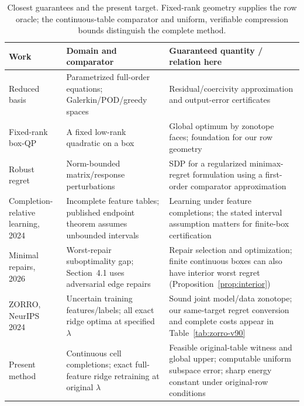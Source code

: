 \begin{table}[t]\centering\small\setlength{\tabcolsep}{4pt}
\caption{Closest guarantees and the present target. Fixed-rank geometry supplies the row oracle; the continuous-table comparator and uniform, verifiable compression bounds distinguish the complete method.}\label{tab:closest-main-v81}
\begin{tabular}{p{}p{}p{}}\toprule
Work&Domain and comparator&Guaranteed quantity / relation here\\\midrule
Reduced basis~\citep{quarteroni2011,balabanov2019}&Parametrized full-order equations; Galerkin/POD/greedy spaces&Residual/coercivity approximation and output-error certificates\\
Fixed-rank box-QP~\citep{hladik2021}&A fixed low-rank quadratic on a box&Global optimum by zonotope faces; foundation for our row geometry\\
Robust regret~\citep{vanli2014}&Norm-bounded matrix/response perturbations&SDP for a regularized minimax-regret formulation using a first-order comparator approximation\\
Completion-relative learning, 2024~\citep{zhen2024sigmod}&Incomplete feature tables; published endpoint theorem assumes unbounded intervals&Learning under feature completions; the stated interval assumption matters for finite-box certification\\
Minimal repairs, 2026~\citep{repair2026}&Worst-repair suboptimality gap; Section~4.1 uses adversarial edge repairs&Repair selection and optimization; finite continuous boxes can also have interior worst regret (Proposition~\ref{prop:interior})\\
ZORRO, NeurIPS 2024~\citep{zhu2024zorro}&Uncertain training features/labels; all exact ridge optima at specified $\lambda$&Sound joint model/data zonotope; our same-target regret conversion and complete costs appear in Table~\ref{tab:zorro-v90}\\
Present method&Continuous cell completions; exact full-feature ridge retraining at original $\lambda$&Feasible original-table witness and global upper; computable uniform subspace error; sharp energy constant under original-row conditions\\
\bottomrule\end{tabular}\end{table}

